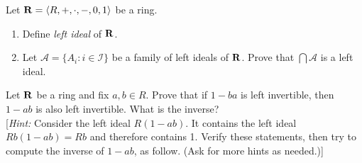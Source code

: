 \begin{solution}


\end{solution}
\probskip



\begin{problem}
Let $\mathbf{R} = \langle R, +, \cdot, -, 0, 1\rangle$ be a ring.  
\begin{enumerate}
\item Define \emph{left ideal} of $\mathbf{R}$.
\item Let $\mathscr{A} = \{A_i : i \in \mathscr{I}\}$ be a family of left ideals
of $\mathbf{R}$.  Prove that $\bigcap \mathscr{A}$ is a left ideal.
\end{enumerate}
\end{problem}
\smallskip
\begin{solution}


\end{solution}
\probskip


\begin{problem}
Let $\mathbf{R}$ be a ring and fix $a, b \in R$.  Prove that if $1 - ba$ is left
invertible, then $1 - ab$ is also left invertible.  What is the inverse?\\[4pt]
[{\it Hint:} Consider the left ideal $R(1 - ab)$.  It contains the left ideal
  $Rb(1-ab) = Rb$ and therefore contains 1. Verify these statements, then
  try to compute the inverse of $1-ab$, as follow.  (Ask for more hints as needed.)] 
\end{problem}
\smallskip
\begin{solution}


\end{solution}
\probskip




